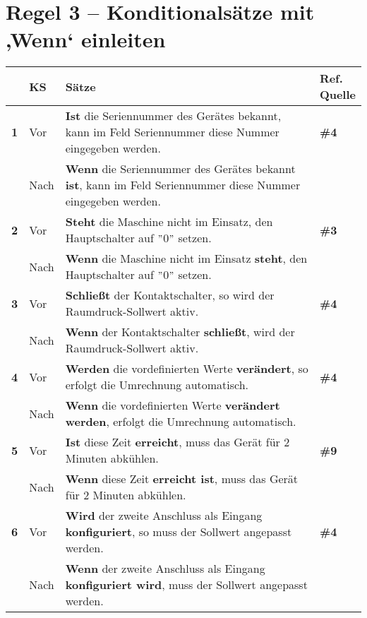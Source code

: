 \section*{Regel 3 -- Konditionalsätze mit ‚Wenn‘ einleiten}


\begin{longtable}{llp{}l}

\lsptoprule
{} & \textbf{KS} & \textbf{Sätze} & \makecell[tl]{\textbf{Ref.}\\\textbf{Quelle}}\\
\midrule
{ \textbf{1}} & Vor & \textbf{Ist} die Seriennummer des Gerätes bekannt, kann im Feld Seriennummer diese Nummer eingegeben werden. & \textbf{\#4}\\
& Nach & \textbf{Wenn} die Seriennummer des Gerätes bekannt \textbf{ist}, kann im Feld Seriennummer diese Nummer eingegeben werden. & \\
\tablevspace
{ \textbf{2}} & Vor & \textbf{Steht} die Maschine nicht im Einsatz, den Hauptschalter auf $"$0$"$ setzen. & \textbf{\#3}\\
& Nach & \textbf{Wenn} die Maschine nicht im Einsatz \textbf{steht}, den Hauptschalter auf $"$0$"$ setzen. & \\
\tablevspace
{ \textbf{3}} & Vor & \textbf{Schließt} der Kontaktschalter, so wird der Raumdruck-Sollwert aktiv. & \textbf{\#4}\\
& Nach & \textbf{Wenn} der Kontaktschalter \textbf{schließt}, wird der Raumdruck-Sollwert aktiv. & \\
\tablevspace
{ \textbf{4}} & Vor & \textbf{Werden} die vordefinierten Werte \textbf{verändert}, so erfolgt die Umrechnung automatisch. & \textbf{\#4}\\
& Nach & \textbf{Wenn} die vordefinierten Werte \textbf{verändert werden}, erfolgt die Umrechnung automatisch. & \\
\tablevspace
{ \textbf{5}} & Vor & \textbf{Ist} diese Zeit \textbf{erreicht}, muss das Gerät für 2 Minuten abkühlen. & \textbf{\#9}\\
& Nach & \textbf{Wenn} diese Zeit \textbf{erreicht ist}, muss das Gerät für 2 Minuten abkühlen. & \\
\tablevspace
{ \textbf{6}} & Vor & \textbf{Wird} der zweite Anschluss als Eingang \textbf{konfiguriert}, so muss der Sollwert angepasst werden. & \textbf{\#4}\\
& Nach & \textbf{Wenn} der zweite Anschluss als Eingang \textbf{konfiguriert wird}, muss der Sollwert angepasst werden. & \\

\end{longtable}
